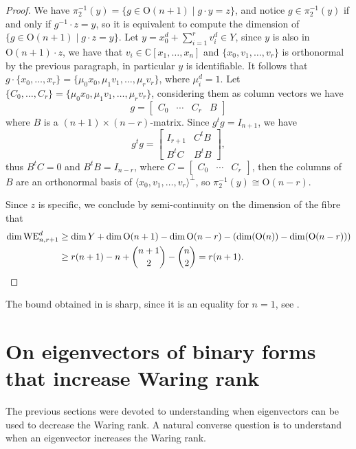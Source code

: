 \documentclass{amsart}
\numberwithin{theorem}{section}
\theoremstyle{definition}
\newcommand{\CC}{\mathbb{C}}
\begin{document}
\begin{proof}
    We have $\pi_2^{-1}(y)=\{g\in\mathrm O(n+1)\mid g\cdot y=z\}$, and notice $g\in \pi_2^{-1}(y)$ if and only if $g^{-1}\cdot z=y$, so it is equivalent to compute the dimension of $\{g\in \mathrm{O}(n+1)\mid g\cdot z=y\}$. Let $y=x_0^d+\sum_{i=1}^r v_i^d\in Y$, since $y$ is also in  $\mathrm O(n+1)\cdot z$, we have that $v_i\in \CC[x_1,\dots,x_n]$ and $\{x_0,v_1,\dots,v_r\}$ is orthonormal by the previous paragraph, in particular $y$ is identifiable. It follows that $g\cdot \{x_0,\dots,x_r\}=\{\mu_0x_0,\mu_1v_1,\dots, \mu_rv_r\}$, where $\mu_i^d=1$. Let $\{C_0,\dots,C_r\}=\{\mu_0x_0,\mu_1v_1,\dots, \mu_rv_r\}$, considering them as column vectors we have
    $$
    g=\begin{bmatrix}
        C_0&\cdots &C_r &B
    \end{bmatrix}
    $$
    where $B$ is a $(n+1)\times(n-r)$-matrix. Since $g^tg=I_{n+1}$, we have $$
        g^tg=\begin{bmatrix}
        I_{r+1}&C^tB\\
        B^tC&B^tB
    \end{bmatrix},
    $$
    thus $B^tC=0$ and $B^tB=I_{n-r}$, where $C=\begin{bmatrix}
        C_0&\cdots &C_r
    \end{bmatrix}$,  then the columns of $B$ are an orthonormal basis of $\langle x_0,v_1,\dots,v_r\rangle^\perp$,  so $\pi_2^{-1}(y)\cong \mathrm{O}(n-r)$. 
    
    Since $z$ is specific, we conclude by semi-continuity on the dimension of the fibre that 
    \begin{align*}
        \dim \mathrm{WE}_{n,r+1}^d&\geq \dim Y+\dim \mathrm{O}(n+1)-\dim \mathrm O(n-r) -(\dim (\mathrm O(n))-\dim (\mathrm O(n-r)))\\
        &\geq r(n+1)-n + {n+1\choose 2}-{n\choose 2}=r(n+1). \qedhere
    \end{align*}
\end{proof}

{The bound obtained in  is sharp, since it is an equality for $n=1$, see .}



\section{On eigenvectors of binary forms that increase Waring rank}\label{sec: grow}

The previous sections were devoted to understanding when eigenvectors can be used to decrease the Waring rank. A natural converse question is to understand when an eigenvector increases the Waring rank. 
\end{document}
